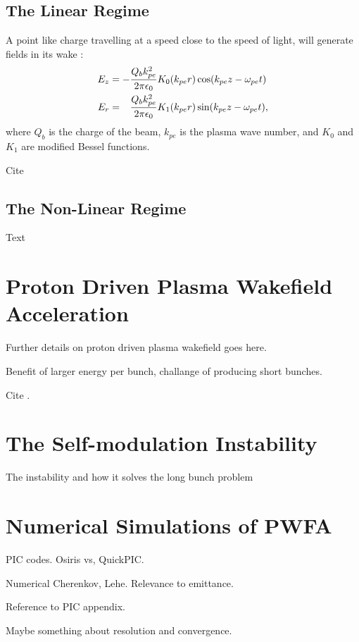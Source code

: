 \subsection{The Linear Regime}
\label{Int:PWFA:Lin}

A point like charge travelling at a speed close to the speed of light, will generate fields in its wake \cite{van_der_meer:1985,chen:1985}:
\begin{align}
    E_{z} &= -\frac{Q_{b}k_{pe}^{2}}{2\pi\epsilon_{0}} K_{0}(k_{pe}r)\cos(k_{pe}z - \omega_{pe}t) \label{EQ:PWFA:EZ} \\
    E_{r} &= \hphantom{-} \frac{Q_{b}k_{pe}^{2}}{2\pi\epsilon_{0}} K_{1}(k_{pe}r)\sin(k_{pe}z - \omega_{pe}t), \label{EQ:PWFA:ER}
\end{align}
where $Q_{b}$ is the charge of the beam, $k_{pe}$ is the plasma wave number, and $K_{0}$ and $K_{1}$ are modified Bessel functions. 

Cite \cite{ruth:1985}

\subsection{The Non-Linear Regime}
\label{Int:PWFA:NLin}

Text

\section{Proton Driven Plasma Wakefield Acceleration}
\label{Int:PDPWFA}

Further details on proton driven plasma wakefield goes here.

Benefit of larger energy per bunch, challange of producing short bunches.

Cite \cite{adli:2016-1}.

\section{The Self-modulation Instability}
\label{Int:SMI}

The instability and how it solves the long bunch problem

\section{Numerical Simulations of PWFA}
\label{Int:Sim}

PIC codes. Osiris vs, QuickPIC.

Numerical Cherenkov, Lehe. Relevance to emittance.

Reference to PIC appendix.

Maybe something about resolution and convergence.

